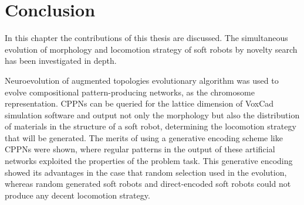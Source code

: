

\chapter{Conclusion} %

\label{Conclusion} %


In this chapter the contributions of this thesis are discussed. The simultaneous evolution of morphology and locomotion strategy of soft robots by novelty search has been investigated in depth. 

Neuroevolution of augmented topologies evolutionary algorithm was used to evolve compositional pattern-producing networks, as the chromosome representation. CPPNs can be queried for the lattice dimension of VoxCad simulation software and output not only the morphology but also the distribution of materials in the structure of a soft robot, determining the locomotion strategy that will be generated. The merits of using a generative encoding scheme like CPPNs were shown, where regular patterns in the output of these artificial networks exploited the properties of the problem task. This generative encoding showed its advantages in the case that random selection used in the evolution, whereas random generated soft robots and direct-encoded soft robots could not produce any decent locomotion strategy. 

